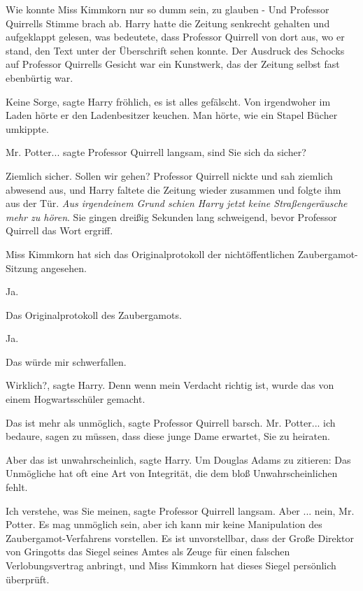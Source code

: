 \glqq Wie konnte Miss Kimmkorn nur so dumm sein, zu glauben -\grqq{} Und
Professor Quirrells Stimme brach ab. Harry hatte die Zeitung senkrecht gehalten
und aufgeklappt gelesen, was bedeutete, dass Professor Quirrell von dort aus, wo
er stand, den Text unter der Überschrift sehen konnte. Der Ausdruck des Schocks
auf Professor Quirrells Gesicht war ein Kunstwerk, das der Zeitung selbst fast
ebenbürtig war.

\glqq Keine Sorge\grqq{}, sagte Harry fröhlich, \glqq es ist alles
gefälscht.\grqq{} Von irgendwoher im Laden hörte er den Ladenbesitzer keuchen.
Man hörte, wie ein Stapel Bücher umkippte.

\glqq Mr. Potter...\grqq{} sagte Professor Quirrell langsam, \glqq sind Sie sich
da sicher?\grqq{}

\glqq Ziemlich sicher. Sollen wir gehen?\grqq{} Professor Quirrell nickte und
sah ziemlich abwesend aus, und Harry faltete die Zeitung wieder zusammen und
folgte ihm aus der Tür. \emph{Aus irgendeinem Grund schien Harry jetzt keine
Straßengeräusche mehr zu hören}. Sie gingen dreißig Sekunden lang schweigend,
bevor Professor Quirrell das Wort ergriff.

\glqq Miss Kimmkorn hat sich das Originalprotokoll der nichtöffentlichen
Zaubergamot-Sitzung angesehen.\grqq{}

\glqq Ja.\grqq{}

\glqq Das Originalprotokoll des Zaubergamots.\grqq{}

\glqq Ja.\grqq{}

\glqq Das würde mir schwerfallen.\grqq{}

\glqq Wirklich?\grqq{}, sagte Harry. \glqq Denn wenn mein Verdacht richtig ist,
wurde das von einem Hogwartsschüler gemacht.\grqq{}

\glqq Das ist mehr als unmöglich\grqq{}, sagte Professor Quirrell barsch. \glqq
Mr. Potter... ich bedaure, sagen zu müssen, dass diese junge Dame erwartet, Sie
zu heiraten.\grqq{}

\glqq Aber das ist unwahrscheinlich\grqq{}, sagte Harry. \glqq Um Douglas Adams
zu zitieren: Das Unmögliche hat oft eine Art von Integrität, die dem bloß
Unwahrscheinlichen fehlt.\grqq{}

\glqq Ich verstehe, was Sie meinen\grqq{}, sagte Professor Quirrell langsam.
\glqq Aber ... nein, Mr. Potter. Es mag unmöglich sein, aber ich kann mir keine
Manipulation des Zaubergamot-Verfahrens vorstellen. Es ist unvorstellbar, dass
der Große Direktor von Gringotts das Siegel seines Amtes als Zeuge für einen
falschen Verlobungsvertrag anbringt, und Miss Kimmkorn hat dieses Siegel
persönlich überprüft.\grqq{}

